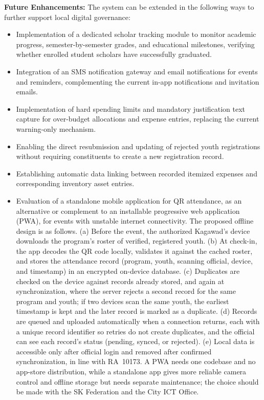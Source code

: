 \vspace{2mm}
\textbf{Future Enhancements:} The system can be extended in the following ways to further support local digital governance:
\begin{itemize}
    \item Implementation of a dedicated scholar tracking module to monitor academic progress, semester-by-semester grades, and educational milestones, verifying whether enrolled student scholars have successfully graduated.
    \item Integration of an SMS notification gateway and email notifications for events and reminders, complementing the current in-app notifications and invitation emails.
    \item Implementation of hard spending limits and mandatory justification text capture for over-budget allocations and expense entries, replacing the current warning-only mechanism.
    \item Enabling the direct resubmission and updating of rejected youth registrations without requiring constituents to create a new registration record.
    \item Establishing automatic data linking between recorded itemized expenses and corresponding inventory asset entries.
    \item Evaluation of a standalone mobile application for QR attendance, as an alternative or complement to an installable progressive web application (PWA), for events with unstable internet connectivity. The proposed offline design is as follows. (a) Before the event, the authorized Kagawad's device downloads the program's roster of verified, registered youth. (b) At check-in, the app decodes the QR code locally, validates it against the cached roster, and stores the attendance record (program, youth, scanning official, device, and timestamp) in an encrypted on-device database. (c) Duplicates are checked on the device against records already stored, and again at synchronization, where the server rejects a second record for the same program and youth; if two devices scan the same youth, the earliest timestamp is kept and the later record is marked as a duplicate. (d) Records are queued and uploaded automatically when a connection returns, each with a unique record identifier so retries do not create duplicates, and the official can see each record's status (pending, synced, or rejected). (e) Local data is accessible only after official login and removed after confirmed synchronization, in line with RA~10173. A PWA needs one codebase and no app-store distribution, while a standalone app gives more reliable camera control and offline storage but needs separate maintenance; the choice should be made with the SK Federation and the City ICT Office.

\end{itemize}
